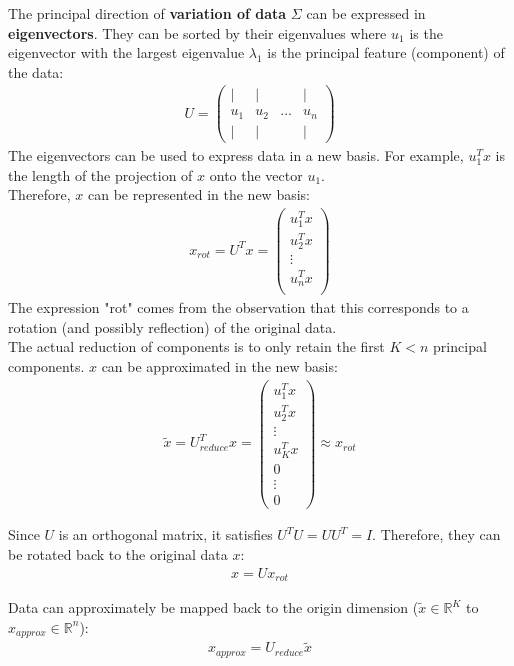 \documentclass{report}
\begin{document}
The principal direction of {\bf variation of data} $\Sigma$ can be expressed in {\bf eigenvectors}.
They can be sorted by their eigenvalues where $u_1$ is the eigenvector with the largest eigenvalue $\lambda_1$ is the principal feature (component) of the data:
\begin{align*}
U = \begin{pmatrix}
| & | & & |  \\
u_1 & u_2 & \dots & u_n \\
| & | & & |
\end{pmatrix}
\end{align*}
The eigenvectors can be used to express data in a new basis. For example, $u_1^T x$ is the length of the projection of $x$ onto the vector $u_1$.
\\
Therefore, $x$ can be represented in the new basis:
\begin{align*}
x_{rot} = U^T x = \begin{pmatrix}
u_1^Tx \\
u_2^Tx \\
\vdots \\
u_n^Tx \\
\end{pmatrix}
\end{align*}
The expression "rot" comes from the observation that this corresponds to a rotation (and possibly reflection) of the original data.
\\

The actual reduction of components is to only retain the first $K<n$ principal components. $x$ can be approximated in the new basis:
\begin{align*}
\tilde{x} = U_{reduce}^T x = \begin{pmatrix}
u_1^Tx \\
u_2^Tx \\
\vdots \\
u_K^Tx \\
0 \\
\vdots \\
0
\end{pmatrix} \approx x_{rot}
\end{align*}

Since $U$ is an orthogonal matrix, it satisfies $U^TU=UU^T=I$.
Therefore, they can be rotated back to the original data $x$:
\begin{align*}
x = U x_{rot}
\end{align*}

Data can approximately be mapped back to the origin dimension ($\tilde{x} \in \mathbb{R}^K$ to $x_{approx} \in \mathbb{R}^n$):
\begin{align*}
x_{approx} = U_{reduce}\tilde{x}
\end{align*}
\end{document}
